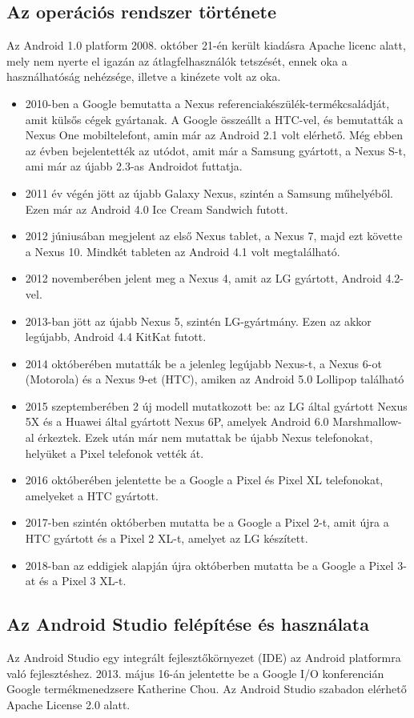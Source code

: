 \documentclass[]{thesis-ekf}
\theoremstyle{definition}
\begin{document}
\subsection{Az operációs rendszer története}
Az Android 1.0 platform 2008. október 21-én került kiadásra Apache licenc alatt, mely nem nyerte el igazán az átlagfelhasználók tetszését, ennek oka a használhatóság nehézsége, illetve a kinézete volt az oka.
\begin{itemize}
	\item 2010-ben a Google bemutatta a Nexus referenciakészülék-termékcsaládját, amit külsős cégek gyártanak. A Google összeállt a HTC-vel, és bemutatták a Nexus One mobiltelefont, amin már az Android 2.1 volt elérhető. Még ebben az évben bejelentették az utódot, amit már a Samsung gyártott, a Nexus S-t, ami már az újabb 2.3-as Androidot futtatja.
	\item 2011 év végén jött az újabb Galaxy Nexus, szintén a Samsung műhelyéből. Ezen már az Android 4.0 Ice Cream Sandwich futott.
	\item 2012 júniusában megjelent az első Nexus tablet, a Nexus 7, majd ezt követte a Nexus 10. Mindkét tableten az Android 4.1 volt megtalálható.
	\item 2012 novemberében jelent meg a Nexus 4, amit az LG gyártott, Android 4.2-vel.
	\item 2013-ban jött az újabb Nexus 5, szintén LG-gyártmány. Ezen az akkor legújabb, Android 4.4 KitKat futott.
	\item 2014 októberében mutatták be a jelenleg legújabb Nexus-t, a Nexus 6-ot (Motorola) és a Nexus 9-et (HTC), amiken az Android 5.0 Lollipop található
	\item 2015 szeptemberében 2 új modell mutatkozott be: az LG által gyártott Nexus 5X és a Huawei által gyártott Nexus 6P, amelyek Android 6.0 Marshmallow-al érkeztek. Ezek után már nem mutattak be újabb Nexus telefonokat, helyüket a Pixel telefonok vették át.
	\item 2016 októberében jelentette be a Google a Pixel és Pixel XL telefonokat, amelyeket a HTC gyártott.
	\item 2017-ben szintén októberben mutatta be a Google a Pixel 2-t, amit újra a HTC gyártott és a Pixel 2 XL-t, amelyet az LG készített.
	\item 2018-ban az eddigiek alapján újra októberben mutatta be a Google a Pixel 3-at és a Pixel 3 XL-t.
\end{itemize}
\newpage

\subsection{Az Android Studio felépítése és használata}\label{android-studio}
Az Android Studio egy integrált fejlesztőkörnyezet (IDE) az Android platformra való fejlesztéshez. 2013. május 16-án jelentette be a Google I/O konferencián Google termékmenedzsere Katherine Chou. Az Android Studio szabadon elérhető Apache License 2.0 alatt.
\end{document}
